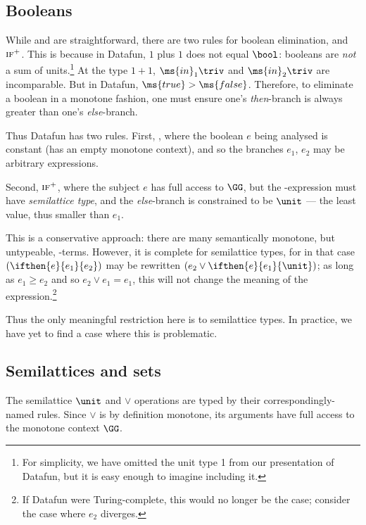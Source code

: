 \subsection{Booleans}
While  and  are straightforward, there are two rules for
boolean elimination,  and $\textsc{if}^+$. This is because in Datafun, $1$
plus $1$ does not equal $\bool$: booleans are \emph{not} a sum of
units.\footnote{For simplicity, we have omitted the unit type 1 from our
  presentation of Datafun, but it is easy enough to imagine including it.} At
the type $1 + 1$, $\ms{in}_1 \triv$ and $\ms{in}_2 \triv$ are incomparable. But
in Datafun, $\ms{true} > \ms{false}$. Therefore, to eliminate a boolean in a
monotone fashion, one must ensure one's \emph{then}-branch is always greater
than one's \emph{else}-branch.

Thus Datafun has two  rules. First, , where the boolean $e$ being
analysed is constant (has an empty monotone context), and so the branches $e_1$,
$e_2$ may be arbitrary expressions.

Second, $\textsc{if}^+$, where the subject $e$ has full access to $\GG$, but the
-expression must have \emph{semilattice type}, and the \emph{else}-branch
is constrained to be $\unit$ --- the least value, thus smaller than $e_1$.

This is a conservative approach: there are many semantically monotone, but
untypeable, -terms. However, it is complete for semilattice types, for in
that case $(\ifthen{e}{e_1}{e_2})$ may be rewritten $(e_2 \vee
\ifthen{e}{e_1}{\unit})$; as long as $e_1 \ge e_2$ and so $e_2 \vee e_1 = e_1$,
this will not change the meaning of the expression.\footnote{If Datafun were
  Turing-complete, this would no longer be the case; consider the case where
  $e_2$ diverges.}

Thus the only meaningful restriction here is to semilattice types. In practice,
we have yet to find a case where this is problematic.


\subsection{Semilattices and sets}
The semilattice $\unit$ and $\vee$ operations are typed by their
correspondingly-named rules. Since $\vee$ is by definition monotone, its
arguments have full access to the monotone context $\GG$.

